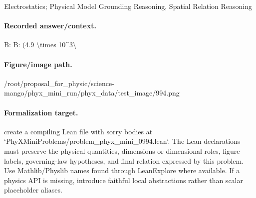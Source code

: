 Electrostatics; Physical Model Grounding Reasoning, Spatial Relation Reasoning

\paragraph{Recorded answer/context.}
B: B: (4.9 \textbackslash{}times 10\textasciicircum{}3\textbackslash{}

\paragraph{Figure/image path.}
/root/proposal\_for\_physic/science-mango/phyx\_mini\_run/phyx\_data/test\_image/994.png

\paragraph{Formalization target.}
create a compiling Lean file with sorry bodies at `PhyXMiniProblems/problem\_phyx\_mini\_0994.lean`. The Lean declarations must preserve the physical quantities, dimensions or dimensional roles, figure labels, governing-law hypotheses, and final relation expressed by this problem.
Use Mathlib/Physlib names found through LeanExplore where available. If a physics API is missing, introduce faithful local abstractions rather than scalar placeholder aliases.

